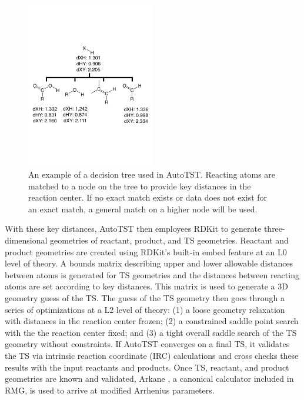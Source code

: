 \documentclass[preprint, 11pt]{elsarticle} %
\begin{document}
\begin{figure}[h!]
    \centering
    \includegraphics[width=0.5\textwidth]{autotst_tree}
    \caption{An example of a decision tree used in AutoTST. Reacting atoms are matched to a node on the tree to provide key distances in the reaction center. If no exact match exists or data does not exist for an exact match, a general match on a higher node will be used.}
    \label{fig:autotst_tree}
\end{figure}

With these key distances, AutoTST then employees RDKit \cite{RDKit:2018} to generate three-dimensional geometries of reactant, product, and TS geometries.
Reactant and product geometries are created using RDKit's built-in embed feature at an L0 level of theory. 
A bounds matrix describing upper and lower allowable distances between atoms is generated for TS geometries and the distances between reacting atoms are set according to key distances.
This matrix is used to generate a 3D geometry guess of the TS.
The guess of the TS geometry then goes through a series of optimizations at a L2 level of theory: (1) a loose geometry relaxation with distances in the reaction center frozen; (2) a constrained saddle point search with the the reaction center fixed; and (3) a tight overall saddle search of the TS geometry without constraints.
If AutoTST converges on a final TS, it validates the TS via intrinsic reaction coordinate (IRC) calculations \cite{Fukui:1970} and cross checks these results with the input reactants and products.
Once TS, reactant, and product geometries are known and validated, Arkane \cite{gao:2016}, a canonical calculator included in RMG, is used to arrive at modified Arrhenius parameters.
\end{document}
